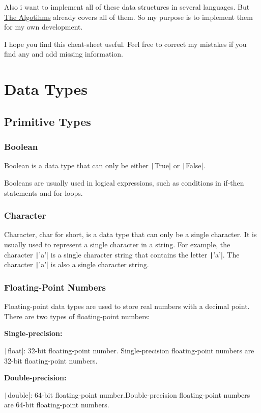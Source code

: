 \documentclass{book}
\begin{document}
Also i want to implement all of these data structures in several languages. But \href{https://the-algorithms.com/}{The Algotihms} already covers all of them. So my purpose is to implement them for my own development. 

I hope you find this cheat-sheet useful. Feel free to correct my mistakes if you find any and add missing information.

\pagebreak
\phantom{a}
\thispagestyle{empty}
\pagebreak

\chapter{Data Types}

\section{Primitive Types}

\subsection{Boolean}
    
    Boolean is a data type that can only be either \texttt|True| or \texttt|False|.
    
    \noindent Booleans are usually used in logical expressions, such as conditions in if-then statements and for loops.

\subsection{Character}

    Character, char for short, is a data type that can only be a single character. It is usually used to represent a single character in a string. For example, the character \texttt|'a'| is a single character string that contains the letter \texttt|'a'|. The character \texttt|'a'| is also a single character string.

\subsection{Floating-Point Numbers}

    Floating-point data types are used to store real numbers with a decimal point. There are two types of floating-point numbers:
    
    \textbf{Single-precision:}
    \par
    \texttt|float|: 32-bit floating-point number.
        Single-precision floating-point numbers are 32-bit floating-point numbers.
    \par
    \textbf{Double-precision:}
    \par
    \texttt|double|: 64-bit floating-point number.Double-precision floating-point numbers are 64-bit floating-point numbers.\hfill \break
    
\end{document}

